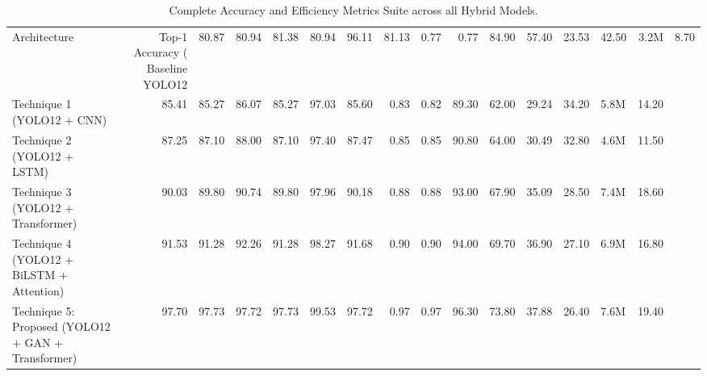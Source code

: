 \begin{table}
\caption{Complete Accuracy and Efficiency Metrics Suite across all Hybrid Models.}
\label{tab:all_accuracy_metrics}
\begin{tabular}{lrrrrrrrrrrrrlr}
\toprule
Architecture & Top-1 Accuracy (%
\midrule
Baseline YOLO12 & 80.87 & 80.94 & 81.38 & 80.94 & 96.11 & 81.13 & 0.77 & 0.77 & 84.90 & 57.40 & 23.53 & 42.50 & 3.2M & 8.70 \\
Technique 1 (YOLO12 + CNN) & 85.41 & 85.27 & 86.07 & 85.27 & 97.03 & 85.60 & 0.83 & 0.82 & 89.30 & 62.00 & 29.24 & 34.20 & 5.8M & 14.20 \\
Technique 2 (YOLO12 + LSTM) & 87.25 & 87.10 & 88.00 & 87.10 & 97.40 & 87.47 & 0.85 & 0.85 & 90.80 & 64.00 & 30.49 & 32.80 & 4.6M & 11.50 \\
Technique 3 (YOLO12 + Transformer) & 90.03 & 89.80 & 90.74 & 89.80 & 97.96 & 90.18 & 0.88 & 0.88 & 93.00 & 67.90 & 35.09 & 28.50 & 7.4M & 18.60 \\
Technique 4 (YOLO12 + BiLSTM + Attention) & 91.53 & 91.28 & 92.26 & 91.28 & 98.27 & 91.68 & 0.90 & 0.90 & 94.00 & 69.70 & 36.90 & 27.10 & 6.9M & 16.80 \\
Technique 5: Proposed (YOLO12 + GAN + Transformer) & 97.70 & 97.73 & 97.72 & 97.73 & 99.53 & 97.72 & 0.97 & 0.97 & 96.30 & 73.80 & 37.88 & 26.40 & 7.6M & 19.40 \\
\bottomrule
\end{tabular}
\end{table}
